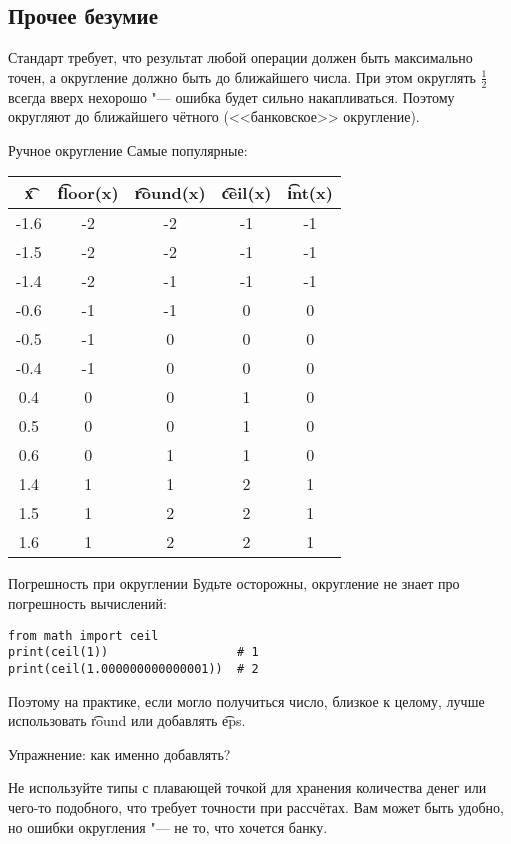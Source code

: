 \subsection{Прочее безумие}

\begin{frame}
\end{frame}

\begin{frame}
	Стандарт требует, что результат любой операции должен быть максимально точен, а округление должно быть до ближайшего числа.
	При этом округлять $\frac{1}{2}$ всегда вверх нехорошо "--- ошибка будет сильно накапливаться.
	Поэтому округляют до ближайшего чётного (<<банковское>> округление).
\end{frame}

\begin{frame}{Ручное округление}
	Самые популярные:
	\begin{center}
		\begin{tabular}{|c|c|c|c|c|}
			\hline
			\t{x} & \t{floor(x)} & \t{round(x)} & \t{ceil(x)} & \t{int(x) } \\\hline
			-1.6 & -2 & -2 & -1 & -1 \\\hline
			-1.5 & -2 & -2 & -1 & -1 \\\hline
			-1.4 & -2 & -1 & -1 & -1 \\\hline
			-0.6 & -1 & -1 & 0 & 0 \\\hline
			-0.5 & -1 & 0 & 0 & 0 \\\hline
			-0.4 & -1 & 0 & 0 & 0 \\\hline
			0.4 & 0 & 0 & 1 & 0 \\\hline
			0.5 & 0 & 0 & 1 & 0 \\\hline
			0.6 & 0 & 1 & 1 & 0 \\\hline
			1.4 & 1 & 1 & 2 & 1 \\\hline
			1.5 & 1 & 2 & 2 & 1 \\\hline
			1.6 & 1 & 2 & 2 & 1 \\\hline
		\end{tabular}
	\end{center}
\end{frame}

\begin{frame}[fragile]{Погрешность при округлении}
	Будьте осторожны, округление не знает про погрешность вычислений:
\begin{verbatim}
from math import ceil
print(ceil(1))                  # 1
print(ceil(1.000000000000001))  # 2
\end{verbatim}
	Поэтому на практике, если могло получиться число, близкое к целому, лучше использовать \t{round} или добавлять \t{eps}.

	Упражнение: как именно добавлять?

	Не используйте типы с плавающей точкой для хранения количества денег или чего-то подобного, что требует точности при рассчётах.
	Вам может быть удобно, но ошибки округления "--- не то, что хочется банку.
\end{frame}
